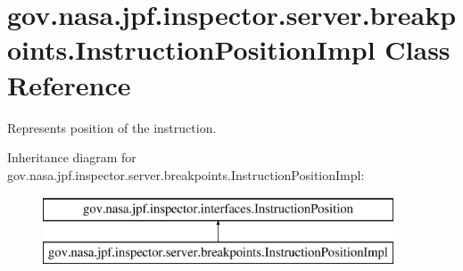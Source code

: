 \hypertarget{classgov_1_1nasa_1_1jpf_1_1inspector_1_1server_1_1breakpoints_1_1_instruction_position_impl}{}\section{gov.\+nasa.\+jpf.\+inspector.\+server.\+breakpoints.\+Instruction\+Position\+Impl Class Reference}
\label{classgov_1_1nasa_1_1jpf_1_1inspector_1_1server_1_1breakpoints_1_1_instruction_position_impl}


Represents position of the instruction.  


Inheritance diagram for gov.\+nasa.\+jpf.\+inspector.\+server.\+breakpoints.\+Instruction\+Position\+Impl\+:\begin{figure}[H]
\begin{center}
\leavevmode
\includegraphics[height=2.000000cm]{classgov_1_1nasa_1_1jpf_1_1inspector_1_1server_1_1breakpoints_1_1_instruction_position_impl}
\end{center}
\end{figure}

